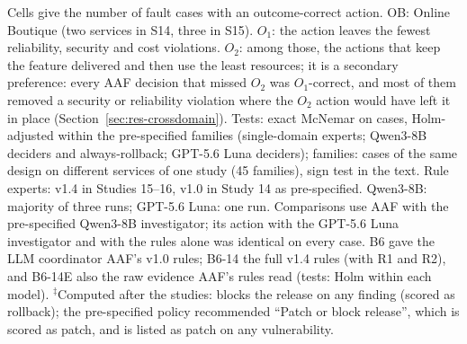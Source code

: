 \begin{table}[!t]
\begin{tabular}
\bottomrule
\end{tabular}
\par\vspace{2pt}\raggedright\scriptsize Cells give the number of fault cases with an outcome-correct action. OB: Online Boutique (two services in S14, three in S15). $O_1$: the action leaves the fewest reliability, security and cost violations. $O_2$: among those, the actions that keep the feature delivered and then use the least resources; it is a secondary preference: every AAF decision that missed $O_2$ was $O_1$-correct, and most of them removed a security or reliability violation where the $O_2$ action would have left it in place (Section~\ref{sec:res-crossdomain}). Tests: exact McNemar on cases, Holm-adjusted within the pre-specified families (single-domain experts; Qwen3-8B deciders and always-rollback; GPT-5.6 Luna deciders); families: cases of the same design on different services of one study (45 families), sign test in the text. Rule experts: v1.4 in Studies 15--16, v1.0 in Study 14 as pre-specified. Qwen3-8B: majority of three runs; GPT-5.6 Luna: one run. Comparisons use AAF with the pre-specified Qwen3-8B investigator; its action with the GPT-5.6 Luna investigator and with the rules alone was identical on every case. B6 gave the LLM coordinator AAF's v1.0 rules; B6-14 the full v1.4 rules (with R1 and R2), and B6-14E also the raw evidence AAF's rules read (tests: Holm within each model). $^\ddagger$Computed after the studies: blocks the release on any finding (scored as rollback); the pre-specified policy recommended ``Patch or block release'', which is scored as patch, and is listed as patch on any vulnerability.
\end{table}
